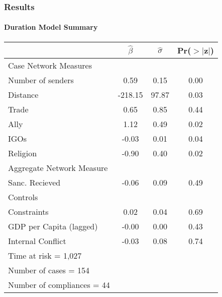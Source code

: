 \begin{frame}
\frametitle{Results}
\framesubtitle{Duration Model Summary}

\footnotesize{
	\begin{table}[ht]
		\begin{center}
		\begin{tabular}{lccc}
		  \hline\hline
		 &$\hat{\beta}$&$\hat{\sigma}$& Pr($>$$|$z$|$) \\ 
		  \hline
		  Case Network Measures \\
		  \;\;\;   Number of senders & 0.59 & 0.15 & 0.00 \\ 
		  \;\;\;   Distance & -218.15 & 97.87 & 0.03 \\
		  \;\;\;   Trade & 0.65 & 0.85 & 0.44 \\ 
		  \;\;\;   Ally & 1.12 & 0.49 & 0.02 \\ 
		  \;\;\;   IGOs & -0.03 & 0.01 & 0.04 \\ 
		  \;\;\;   Religion & -0.90 & 0.40 & 0.02 \\ 
		  Aggregate Network Measure \\
		  \;\;\;   Sanc. Recieved & -0.06 & 0.09 & 0.49 \\ 
		  Controls \\
		  \;\;\;   Constraints & 0.02 & 0.04 & 0.69 \\ 		  
		  \;\;\;   GDP per Capita (lagged) & -0.00 & 0.00 & 0.43 \\ 
		  \;\;\;   Internal Conflict & -0.03 & 0.08 & 0.74 \\ 
		   \hline
		   Time at risk = 1,027 &&&\\
			 Number of cases = 154 &&&\\
		   Number of compliances = 44 &&&\\
		  \hline\hline
		\end{tabular}
		\end{center}
	\end{table}
}


\end{frame}


